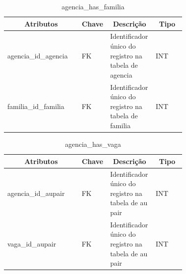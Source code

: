 \begin{enumerate}
    \begin{table}[H]
    \caption{agencia\_has\_familia}
    \label{idioma}
    	\centering\footnotesize
        \begin{tabular}{|p{0.40\linewidth} | p{0.04\linewidth} |  p{0.12\linewidth} | p{0.16\linewidth} |}  \hline
        \multicolumn{1}{|c|}{\textbf{Atributos}} &
        \multicolumn{1}{|c|}{\textbf{Chave}} &
        \multicolumn{1}{c|}{\textbf{Descrição}} &
        \multicolumn{1}{c|}{\textbf{Tipo}} \\ \hline
          
        agencia\_id\_agencia  &  
        FK & 
        Identificador único do registro na tabela de agencia &
        INT
        \\  \hline
        
        familia\_id\_familia  &  
        FK & 
        Identificador único do registro na tabela de familia &
        INT
        \\  \hline
       
        \end{tabular}
    \end{table}
\end{enumerate}


\begin{enumerate}
    \begin{table}[H]
    \caption{agencia\_has\_vaga}
    \label{idioma}
    	\centering\footnotesize
        \begin{tabular}{|p{0.40\linewidth} | p{0.04\linewidth} |  p{0.12\linewidth} | p{0.16\linewidth} |}  \hline
        \multicolumn{1}{|c|}{\textbf{Atributos}} &
        \multicolumn{1}{|c|}{\textbf{Chave}} &
        \multicolumn{1}{c|}{\textbf{Descrição}} &
        \multicolumn{1}{c|}{\textbf{Tipo}} \\ \hline
          
        agencia\_id\_aupair  &  
        FK & 
        Identificador único do registro na tabela de au pair &
        INT
        \\  \hline
        
        vaga\_id\_aupair  &  
        FK & 
        Identificador único do registro na tabela de au pair &
        INT
        \\  \hline
       
        \end{tabular}
    \end{table}
\end{enumerate}

